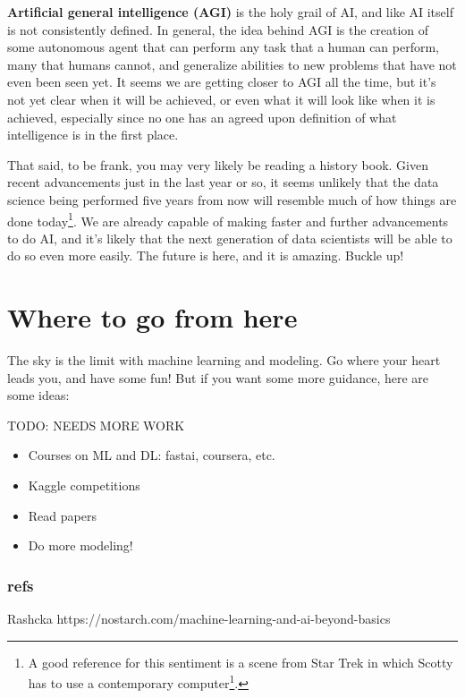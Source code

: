 \documentclass[
  letterpaper,
]{krantz}
\providecommand{\tightlist}{%
  \setlength{\itemsep}{0pt}\setlength{\parskip}{0pt}}\usepackage{longtable,booktabs,array}
\DeclareRobustCommand{\href}[2]{#2\footnote{\url{#1}}}
\begin{document}
\textbf{Artificial general intelligence (AGI)} is the holy grail of AI,
and like AI itself is not consistently defined. In general, the idea
behind AGI is the creation of some autonomous agent that can perform any
task that a human can perform, many that humans cannot, and generalize
abilities to new problems that have not even been seen yet. It seems we
are getting closer to AGI all the time, but it's not yet clear when it
will be achieved, or even what it will look like when it is achieved,
especially since no one has an agreed upon definition of what
intelligence is in the first place.

That said, to be frank, you may very likely be reading a history book.
Given recent advancements just in the last year or so, it seems unlikely
that the data science being performed five years from now will resemble
much of how things are done today\footnote{A good reference for this
  sentiment is a scene from Star Trek in which
  \href{https://www.youtube.com/watch?v=hShY6xZWVGE}{Scotty has to use a
  contemporary computer}.}. We are already capable of making faster and
further advancements to do AI, and it's likely that the next generation
of data scientists will be able to do so even more easily. The future is
here, and it is amazing. Buckle up!

\section{Where to go from here}\label{where-to-go-from-here-2}

The sky is the limit with machine learning and modeling. Go where your
heart leads you, and have some fun! But if you want some more guidance,
here are some ideas:

TODO: NEEDS MORE WORK

\begin{itemize}
\tightlist
\item
  Courses on ML and DL: fastai, coursera, etc.
\item
  Kaggle competitions
\item
  Read papers
\item
  Do more modeling!
\end{itemize}

\subsubsection{refs}\label{refs-3}

Rashcka https://nostarch.com/machine-learning-and-ai-beyond-basics
\end{document}
